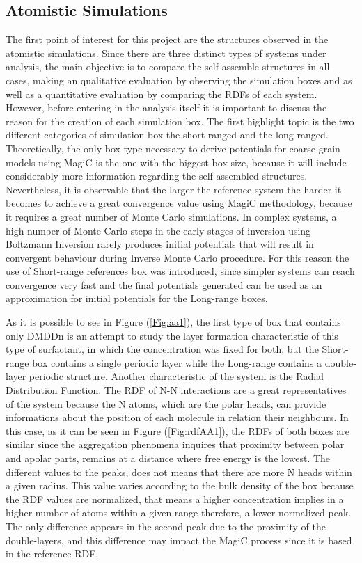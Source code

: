 \documentclass[10pt,a4paper,twoside]{article}
\begin{document}
\subsection{Atomistic Simulations}
\label{sec:atmbxdiss}
The first point of interest for this project are the structures observed in the atomistic simulations. Since there are three distinct types of systems under analysis, the main objective is to compare the self-assemble structures in all cases, making an qualitative evaluation by observing the simulation boxes and as well as a quantitative evaluation by comparing the RDFs of each system. However, before entering in the analysis itself it is important to discuss the reason for the creation of each simulation box. The first highlight topic is the two different categories of simulation box the short ranged and the long ranged. Theoretically, the only box type necessary to derive potentials for coarse-grain models using MagiC is the one with the biggest box size, because it will include considerably more information regarding the self-assembled structures. Nevertheless, it is observable that the larger the reference system the harder it becomes to achieve a great convergence value using MagiC methodology, because it requires a great number of Monte Carlo simulations. In complex systems, a high number of Monte Carlo steps in the early stages of inversion using Boltzmann Inversion rarely produces initial potentials that will result in convergent behaviour during Inverse Monte Carlo procedure. For this reason the use of Short-range references box was introduced, since simpler systems can reach convergence very fast and the final potentials generated can be used as an approximation for initial potentials for the Long-range boxes.

As it is possible to see in Figure (\ref{Fig:aa1}), the first type of box that contains only DMDDn is an attempt to study the layer formation characteristic of this type of surfactant, in which the concentration was fixed for both, but the Short-range box contains a single periodic layer while the Long-range contains a double-layer periodic structure. Another characteristic of the system is the Radial Distribution Function. The RDF of N-N interactions are a great representatives of the system because the N atoms, which are the polar heads, can provide informations about the position of each molecule in relation their neighbours. In this case, as it can be seen in Figure (\ref{Fig:rdfAA1}), the RDFs of both boxes are similar since the aggregation phenomena inquires that proximity between polar and apolar parts, remains at a distance where free energy is the lowest. The different values to the peaks, does not means that there are more N heads within a given radius. This value varies according to the bulk density of the box because the RDF values are normalized, that means a higher concentration implies in a higher number of atoms within a given range  therefore, a lower normalized peak. The only difference appears in the second peak due to the proximity of the double-layers, and this difference may impact the MagiC process since it is based in the reference RDF.
\end{document}
